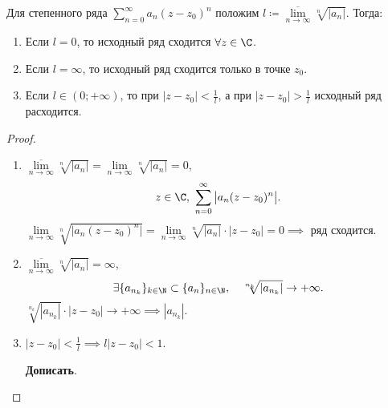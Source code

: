 \begin{theorem}
	Для степенного ряда $ \sum_{n=0}^{\infty}a_n(z-z_0)^n $ положим $ l \coloneqq \underset{n \rightarrow\infty}{\overline{\lim}} \sqrt[n]{| a_n |} $. Тогда:
	\begin{enumerate}
		\item Если $ l=0 $, то исходный ряд сходится $ \forall z \in \C $.
		\item Если $ l=\infty $, то исходный ряд сходится только в точке $ z_0 $.
		\item Если $ l\in(0;+\infty) $, то при $ | z-z_0 | < \frac{1}{l} $, а при $ | z-z_0 | > \frac{1}{l} $ исходный ряд расходится.
	\end{enumerate}
\end{theorem}

\begin{proof}\leavevmode
	\begin{enumerate}
		\item $ \underset{n \rightarrow\infty}{\overline{\lim}} \sqrt[n]{| a_n |} = \underset{n \rightarrow\infty}{\lim} \sqrt[n]{| a_n |} = 0 $,
		      \[
			      z \in \C, \ \sum_{n=0}^{\infty}\big| a_n(z-z_0)^n \big|.
		      \]
		      $ \underset{n \rightarrow \infty}{\lim} \sqrt[n]{\big| a_n(z-z_0)^n \big|} = \underset{n \rightarrow \infty}{\lim} \sqrt[n]{\big| a_n \big|} \cdot | z - z_0 | = 0 \implies $ ряд сходится.
		\item $ \underset{n \rightarrow\infty}{\overline{\lim}} \sqrt[n]{| a_n |} = \infty $,
		      \[
			      \exists\{a_{n_k}\}_{k\in\N} \subset \{a_n\}_{n\in\N}, \quad \sqrt[n_k]{| a_{n_k} |} \rightarrow + \infty.
		      \]
		      $ \sqrt[n_k]{| a_{n_k} |} \cdot | z - z_0 | \rightarrow +\infty \implies | a_{n_k} | $.
		\item $ | z - z_0 | < \frac{1}{l} \implies l | z - z_0 | < 1 $.

		      \textbf{Дописать}.
	\end{enumerate}
\end{proof}
